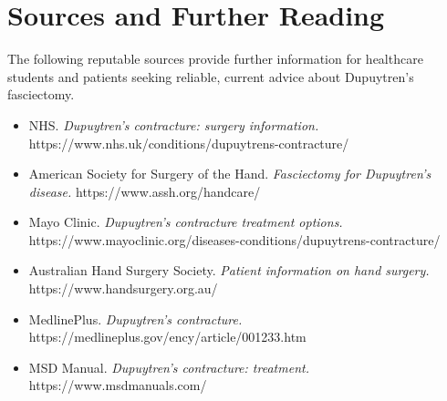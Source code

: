 \section*{Sources and Further Reading}
The following reputable sources provide further information for healthcare students and patients seeking reliable, current advice about Dupuytren's fasciectomy.
\begin{itemize}
    \item NHS. \textit{Dupuytren's contracture: surgery information.} https://www.nhs.uk/conditions/dupuytrens-contracture/
    \item American Society for Surgery of the Hand. \textit{Fasciectomy for Dupuytren's disease.} https://www.assh.org/handcare/
    \item Mayo Clinic. \textit{Dupuytren's contracture treatment options.} https://www.mayoclinic.org/diseases-conditions/dupuytrens-contracture/
    \item Australian Hand Surgery Society. \textit{Patient information on hand surgery.} https://www.handsurgery.org.au/
    \item MedlinePlus. \textit{Dupuytren's contracture.} https://medlineplus.gov/ency/article/001233.htm
    \item MSD Manual. \textit{Dupuytren's contracture: treatment.} https://www.msdmanuals.com/
\end{itemize}
